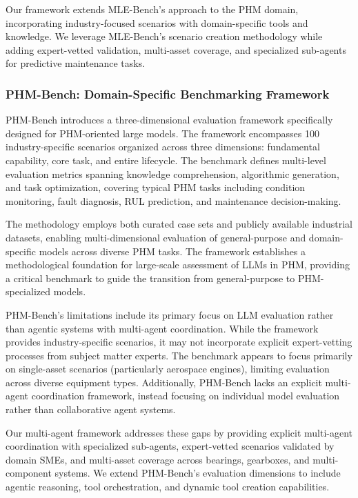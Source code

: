\documentclass[conference]{IEEEtran}
\begin{document}
Our framework extends MLE-Bench's approach to the PHM domain, incorporating industry-focused scenarios with domain-specific tools and knowledge. We leverage MLE-Bench's scenario creation methodology while adding expert-vetted validation, multi-asset coverage, and specialized sub-agents for predictive maintenance tasks.

\subsubsection{PHM-Bench: Domain-Specific Benchmarking Framework}

PHM-Bench \cite{yang2025phmbench} introduces a three-dimensional evaluation framework specifically designed for PHM-oriented large models. The framework encompasses 100 industry-specific scenarios organized across three dimensions: fundamental capability, core task, and entire lifecycle. The benchmark defines multi-level evaluation metrics spanning knowledge comprehension, algorithmic generation, and task optimization, covering typical PHM tasks including condition monitoring, fault diagnosis, RUL prediction, and maintenance decision-making.

The methodology employs both curated case sets and publicly available industrial datasets, enabling multi-dimensional evaluation of general-purpose and domain-specific models across diverse PHM tasks. The framework establishes a methodological foundation for large-scale assessment of LLMs in PHM, providing a critical benchmark to guide the transition from general-purpose to PHM-specialized models.

PHM-Bench's limitations include its primary focus on LLM evaluation rather than agentic systems with multi-agent coordination. While the framework provides industry-specific scenarios, it may not incorporate explicit expert-vetting processes from subject matter experts. The benchmark appears to focus primarily on single-asset scenarios (particularly aerospace engines), limiting evaluation across diverse equipment types. Additionally, PHM-Bench lacks an explicit multi-agent coordination framework, instead focusing on individual model evaluation rather than collaborative agent systems.

Our multi-agent framework addresses these gaps by providing explicit multi-agent coordination with specialized sub-agents, expert-vetted scenarios validated by domain SMEs, and multi-asset coverage across bearings, gearboxes, and multi-component systems. We extend PHM-Bench's evaluation dimensions to include agentic reasoning, tool orchestration, and dynamic tool creation capabilities.
\end{document}
